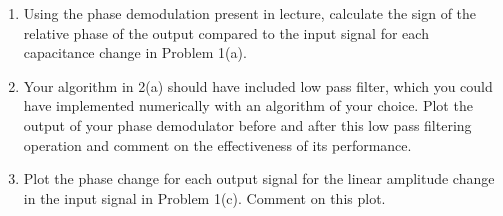 \begin{enumerate}
    \begin{enumerate}
        \item Using the phase demodulation present in lecture, calculate the
            sign of the relative phase of the output compared to the input
            signal for each capacitance change in Problem 1(a).  
            
        \item Your algorithm in 2(a) should have included low pass filter,
            which you could have implemented numerically with an algorithm of
            your choice.  Plot the output of your phase demodulator before and
            after this low pass filtering operation and comment on the
            effectiveness of its performance.

        \item Plot the phase change for each output signal for the linear
            amplitude change in the input signal in Problem 1(c).   Comment on
            this plot.

    \end{enumerate}
\end{enumerate}



